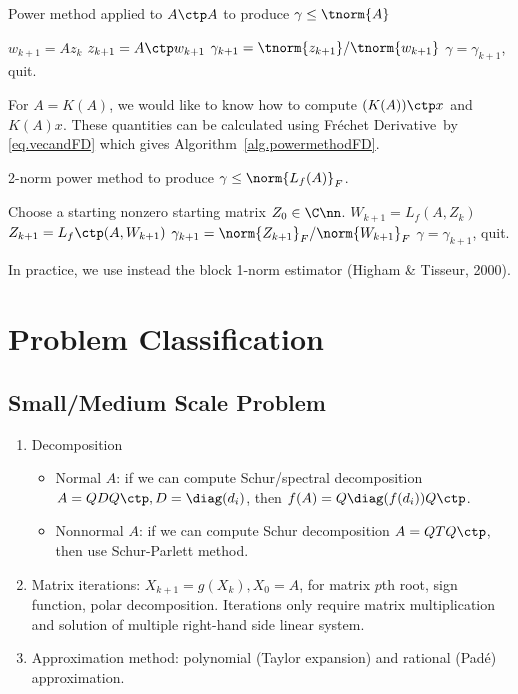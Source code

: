 \documentclass{article}
\def\FD{Fr\'echet Derivative}
\begin{document}
\begin{algorithm}
    \caption{Power method applied to $A\ctp A$ to produce $\gamma \leq
    \tnorm{A}$}
    \begin{algorithmic}[1]
         \State $w_{k+1} = Az_{k}$ \State $z_{k+1} =
        A\ctp w_{k+1}$ \State $\gamma_{k+1} =
        \tnorm{z_{k+1}}/\tnorm{w_{k+1}}$  \State $\gamma
        = \gamma_{k+1}$, quit. \EndIf \EndFor
    \end{algorithmic}
\end{algorithm}
For $A = K(A)$, we would like to know how to compute $(K(A))\ctp x$ and
$K(A)x$. These quantities can be calculated using \FD\ by
\eqref{eq.vecandFD} which gives Algorithm~\ref{alg.powermethodFD}.

\begin{algorithm}[H]
    \caption{2-norm power method to produce $\gamma\leq
    \norm{L_f(A)}_F$.}\label{alg.powermethodFD}
    \begin{algorithmic}[1]
        \State Choose a starting nonzero starting matrix $Z_0 \in
        \C\nn$.  \State $W_{k+1} = L_f(A,Z_k)$
        \State $Z_{k+1} = L_f\ctp (A,W_{k+1})$ \State $\gamma_{k+1} =
        \norm{Z_{k+1}}_F/\norm{W_{k+1}}_F$  \State
        $\gamma = \gamma_{k+1}$, quit. \EndIf \EndFor
    \end{algorithmic}
\end{algorithm}
In practice, we use instead the block 1-norm estimator (Higham \&
Tisseur, 2000).

\section{Problem Classification}
\subsection{Small/Medium Scale Problem}
\begin{enumerate}
    \item Decomposition
    \begin{itemize}
        \item Normal $A$: if we can compute Schur/spectral decomposition
        $A = QDQ\ctp, D = \diag(d_i)$, then $f(A) = Q
        \diag(f(d_i))Q\ctp$.
        \item Nonnormal $A$: if we can compute Schur decomposition $A =
        QTQ\ctp$, then use Schur-Parlett method.
    \end{itemize}
    \item  Matrix iterations: $X_{k+1} = g(X_k), X_0 = A$, for matrix
    $p$th root, sign function, polar decomposition. Iterations only
    require matrix multiplication and solution of multiple right-hand
    side linear system.
    \item Approximation method: polynomial (Taylor expansion) and
    rational (Pad\'e) approximation.
\end{enumerate}
\end{document}
